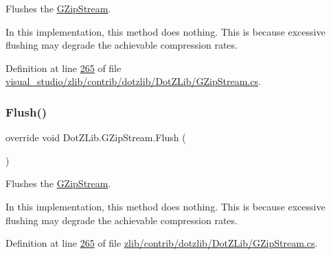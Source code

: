 Flushes the {\ttfamily \hyperlink{class_dot_z_lib_1_1_g_zip_stream}{G\+Zip\+Stream}}. 

In this implementation, this method does nothing. This is because excessive flushing may degrade the achievable compression rates.

Definition at line \hyperlink{visual__studio_2zlib_2contrib_2dotzlib_2_dot_z_lib_2_g_zip_stream_8cs_source_l00265}{265} of file \hyperlink{visual__studio_2zlib_2contrib_2dotzlib_2_dot_z_lib_2_g_zip_stream_8cs_source}{visual\+\_\+studio/zlib/contrib/dotzlib/\+Dot\+Z\+Lib/\+G\+Zip\+Stream.\+cs}.

\mbox{\label{class_dot_z_lib_1_1_g_zip_stream_a1e219fd4cc6c0f3c3bbd373f9724e24e}} 
\subsubsection{\texorpdfstring{Flush()}{Flush()}\hspace{0.1cm}{\footnotesize\ttfamily [2/2]}}
{\footnotesize\ttfamily override void Dot\+Z\+Lib.\+G\+Zip\+Stream.\+Flush (\begin{DoxyParamCaption}{ }\end{DoxyParamCaption})\hspace{0.3cm}{\ttfamily [inline]}}



Flushes the {\ttfamily \hyperlink{class_dot_z_lib_1_1_g_zip_stream}{G\+Zip\+Stream}}. 

In this implementation, this method does nothing. This is because excessive flushing may degrade the achievable compression rates.

Definition at line \hyperlink{zlib_2contrib_2dotzlib_2_dot_z_lib_2_g_zip_stream_8cs_source_l00265}{265} of file \hyperlink{zlib_2contrib_2dotzlib_2_dot_z_lib_2_g_zip_stream_8cs_source}{zlib/contrib/dotzlib/\+Dot\+Z\+Lib/\+G\+Zip\+Stream.\+cs}.

\mbox{\label{class_dot_z_lib_1_1_g_zip_stream_a7f08839f681ed2eec9e3a87a0f1b0b0b}} 
